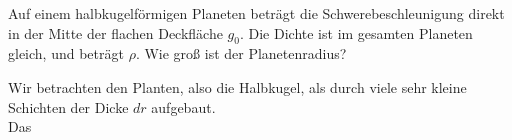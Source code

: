 \begin{Exercise}[label = halfplan, title = Ein halber Planet, origin = {4.Runde IPhO 2015, Kurzaufgabe}, difficulty = 3]
	Auf einem halbkugelförmigen Planeten beträgt die Schwerebeschleunigung direkt in der Mitte der flachen Deckfläche $g_0$.  Die Dichte ist im gesamten Planeten gleich, und beträgt $\rho$. Wie groß ist der Planetenradius?
\end{Exercise}
\begin{Answer}[ref = halfplan]
	Wir betrachten den Planten, also die Halbkugel, als durch viele sehr kleine Schichten der Dicke $dr$ aufgebaut.\\
	Das 
\end{Answer}